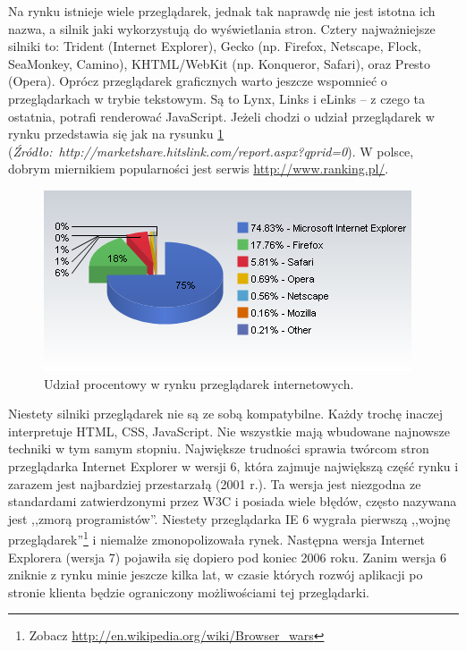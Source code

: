 \documentclass[a4paper,12pt,oneside]{report}
\begin{document}
Na rynku istnieje wiele przeglądarek, jednak tak naprawdę nie jest istotna ich nazwa, a silnik jaki wykorzystują do wyświetlania stron. Cztery najważniejsze silniki to: Trident (Internet Explorer), Gecko (np. Firefox, Netscape, Flock, SeaMonkey, Camino), KHTML/WebKit (np. Konqueror, Safari), oraz Presto (Opera). Oprócz przeglądarek graficznych warto jeszcze wspomnieć o przeglądarkach w trybie tekstowym. Są to Lynx, Links i eLinks -- z czego ta ostatnia, potrafi renderować JavaScript. Jeżeli chodzi o udział przeglądarek w rynku przedstawia się jak na rysunku \ref{fig:przegladarki} (\emph{Źródło:~http://marketshare.hitslink.com/report.aspx?qprid=0}). W polsce, dobrym miernikiem popularności jest serwis \url{http://www.ranking.pl/}.
\begin{figure}[h]
  \begin{center}
  \includegraphics{browsers.png}
  \caption{
  Udział procentowy w rynku przeglądarek internetowych.\label{fig:przegladarki}}
  \end{center}
\end{figure}

Niestety silniki przeglądarek nie są ze sobą kompatybilne. Każdy trochę inaczej interpretuje HTML, CSS, JavaScript. Nie wszystkie mają wbudowane najnowsze techniki w tym samym stopniu. Największe trudności sprawia twórcom stron przeglądarka Internet Explorer w wersji 6, która zajmuje największą część rynku i zarazem jest najbardziej przestarzałą (2001 r.). Ta wersja jest niezgodna ze standardami zatwierdzonymi przez W3C i posiada wiele błędów, często nazywana jest ,,zmorą programistów''. Niestety przeglądarka IE 6 wygrała pierwszą ,,wojnę przeglądarek''\footnote{Zobacz \url{http://en.wikipedia.org/wiki/Browser_wars}} i niemalże zmonopolizowała rynek. Następna wersja Internet Explorera (wersja 7) pojawiła się dopiero pod koniec 2006 roku. Zanim wersja 6 zniknie z rynku minie jeszcze kilka lat, w czasie których rozwój aplikacji po stronie klienta będzie ograniczony możliwościami tej przeglądarki.
\end{document}
